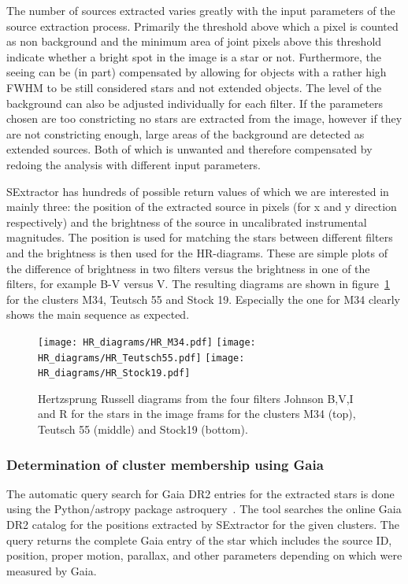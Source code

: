 \documentclass{article}
\begin{document}
The number of sources extracted varies greatly with the input parameters of the source extraction process. Primarily the threshold above which a pixel is counted as non background and the minimum area of joint pixels above this threshold indicate whether a bright spot in the image is a star or not. Furthermore, the seeing can be (in part) compensated by allowing for objects with a rather high FWHM to be still considered stars and not extended objects. The level of the background can also be adjusted individually for each filter. If the parameters chosen are too constricting no stars are extracted from the image, however if they are not constricting enough, large areas of the background are detected as extended sources. Both of which is unwanted and therefore compensated by redoing the analysis with different input parameters. 

SExtractor has hundreds of possible return values of which we are interested in mainly three: the position of the extracted source in pixels (for x and y direction respectively) and the brightness of the source in uncalibrated instrumental magnitudes. The position is used for matching the stars between different filters and the brightness is then used for the HR-diagrams. These are simple plots of the difference of brightness in two filters versus the brightness in one of the filters, for example B-V versus V. The resulting diagrams are shown in figure~\ref{fig:HR} for the clusters M34, Teutsch 55 and Stock 19. Especially the one for M34 clearly shows the main sequence as expected. 

\begin{figure}[H]
    \centering
    \texttt{[image: HR\_diagrams/HR\_M34.pdf]}
    \texttt{[image: HR\_diagrams/HR\_Teutsch55.pdf]}
    \texttt{[image: HR\_diagrams/HR\_Stock19.pdf]}
    \caption{Hertzsprung Russell diagrams from the four filters Johnson B,V,I and R for the stars in the image frams for the clusters M34 (top), Teutsch 55 (middle) and Stock19 (bottom).}
    \label{fig:HR}
\end{figure}

\subsubsection{Determination of cluster membership using Gaia}
\label{sec:Gaia}

The automatic query search for Gaia DR2 entries for the extracted stars is done using the Python/astropy package astroquery~\parencite{astroquery}. The tool searches the online Gaia DR2 catalog for the positions extracted by SExtractor for the given clusters. The query returns the complete Gaia entry of the star which includes the source ID, position, proper motion, parallax, and other parameters depending on which were measured by Gaia. 
\end{document}

